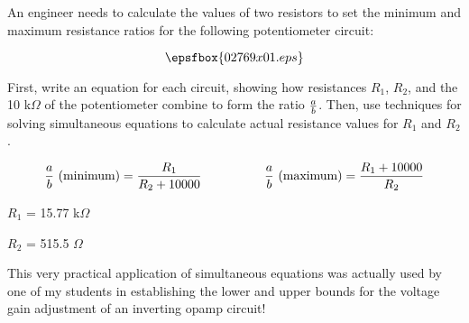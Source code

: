 

An engineer needs to calculate the values of two resistors to set the minimum and maximum resistance ratios for the following potentiometer circuit:

$$\epsfbox{02769x01.eps}$$

First, write an equation for each circuit, showing how resistances $R_1$, $R_2$, and the 10 k$\Omega$ of the potentiometer combine to form the ratio $a \over b$.  Then, use techniques for solving simultaneous equations to calculate actual resistance values for $R_1$ and $R_2$.







$${a \over b} \hbox{ (minimum)} = {R_1 \over {R_2 + 10000}} \hbox{\hskip 50pt} {a \over b} \hbox{ (maximum)} = {{R_1 + 10000 }\over R_2}$$

\vskip 10pt

$R_1$ = 15.77 k$\Omega$

\vskip 10pt

$R_2$ = 515.5 $\Omega$







This very practical application of simultaneous equations was actually used by one of my students in establishing the lower and upper bounds for the voltage gain adjustment of an inverting opamp circuit!




